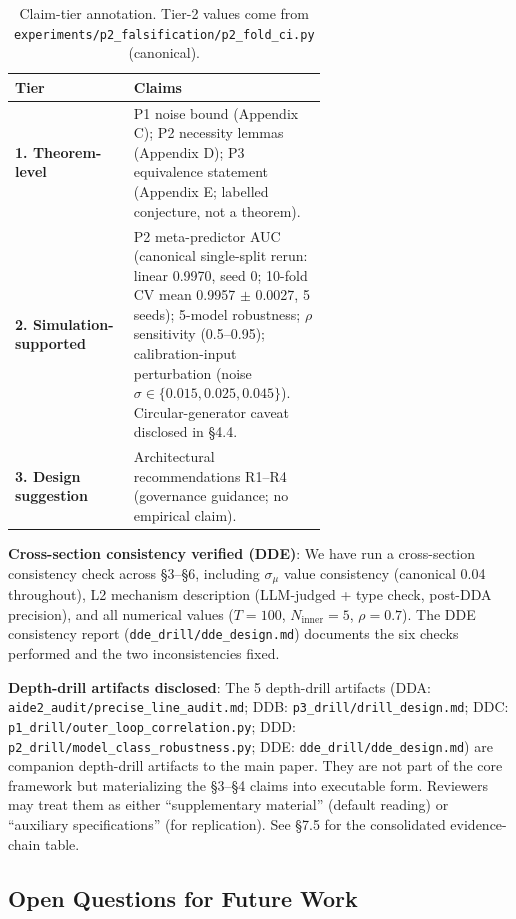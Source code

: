 \begin{table}[h]
\centering
\small
\begin{tabular}{lp{0.62\linewidth}}
\toprule
Tier & Claims \\
\midrule
\textbf{1. Theorem-level} & P1 noise bound (Appendix C); P2 necessity lemmas (Appendix D); P3 equivalence statement (Appendix E; labelled conjecture, not a theorem). \\
\textbf{2. Simulation-supported} & P2 meta-predictor AUC (canonical single-split rerun: linear 0.9970, seed 0; 10-fold CV mean 0.9957 $\pm$ 0.0027, 5 seeds); 5-model robustness; $\rho$ sensitivity (0.5--0.95); calibration-input perturbation (noise $\sigma \in \{0.015, 0.025, 0.045\}$). Circular-generator caveat disclosed in \S4.4. \\
\textbf{3. Design suggestion} & Architectural recommendations R1--R4 (governance guidance; no empirical claim). \\
\bottomrule
\end{tabular}
\caption{Claim-tier annotation. Tier-2 values come from \texttt{experiments/p2\_falsification/p2\_fold\_ci.py} (canonical).}
\label{tab:claim_tiers}
\end{table}
\textbf{Cross-section consistency verified (DDE)}: We have run a cross-section consistency check across \S3--\S6, including $\sigma_\mu$ value consistency (canonical 0.04 throughout), L2 mechanism description (LLM-judged + type check, post-DDA precision), and all numerical values ($T = 100$, $N_{\text{inner}} = 5$, $\rho = 0.7$). The DDE consistency report (\texttt{dde\_drill/dde\_design.md}) documents the six checks performed and the two inconsistencies fixed.

\textbf{Depth-drill artifacts disclosed}: The 5 depth-drill artifacts (DDA: \texttt{aide2\_audit/precise\_line\_audit.md}; DDB: \texttt{p3\_drill/drill\_design.md}; DDC: \texttt{p1\_drill/outer\_loop\_correlation.py}; DDD: \texttt{p2\_drill/model\_class\_robustness.py}; DDE: \texttt{dde\_drill/dde\_design.md}) are companion depth-drill artifacts to the main paper. They are not part of the core framework but materializing the \S3--\S4 claims into executable form. Reviewers may treat them as either ``supplementary material'' (default reading) or ``auxiliary specifications'' (for replication). See \S7.5 for the consolidated evidence-chain table.

\subsection{Open Questions for Future Work}

